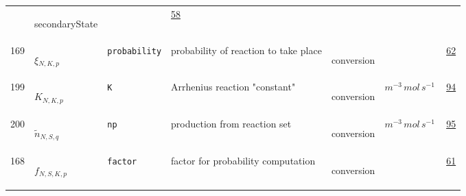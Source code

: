 \begin{longtable}{|p{1cm}|p{2.5cm}|p{4.5cm}|p{8cm}|p{3.0cm}|p{3cm}|p{1cm}|}
             & \begin{lay}secondaryState \end{lay}
             & $  $
             &                 \hyperlink{"e:58"}{ 58 }
                 \\
            169
             & \hypertarget{"v:169"}{ $ {\xi}{_{N, K, p}} $}
             & \verb|probability|
             & probability of reaction to take place
             & \begin{lay}conversion \end{lay}
             & $  $
             &                 \hyperlink{"e:62"}{ 62 }
                 \\
            199
             & \hypertarget{"v:199"}{ $ {K}{_{N, K, p}} $}
             & \verb|K|
             & Arrhenius reaction "constant"
             & \begin{lay}conversion \end{lay}
             & $ m^{-3} \,mol \,s^{-1} \, $
             &                 \hyperlink{"e:94"}{ 94 }
                 \\
            200
             & \hypertarget{"v:200"}{ $ {{\tilde{n}}}{_{N, S, q}} $}
             & \verb|np|
             & production from reaction set
             & \begin{lay}conversion \end{lay}
             & $ m^{-3} \,mol \,s^{-1} \, $
             &                 \hyperlink{"e:95"}{ 95 }
                 \\
            168
             & \hypertarget{"v:168"}{ $ {f}{_{N, S, K, p}} $}
             & \verb|factor|
             & factor for probability computation
             & \begin{lay}conversion \end{lay}
             & $  $
             &                 \hyperlink{"e:61"}{ 61 }
                 \\
    \end{longtable}